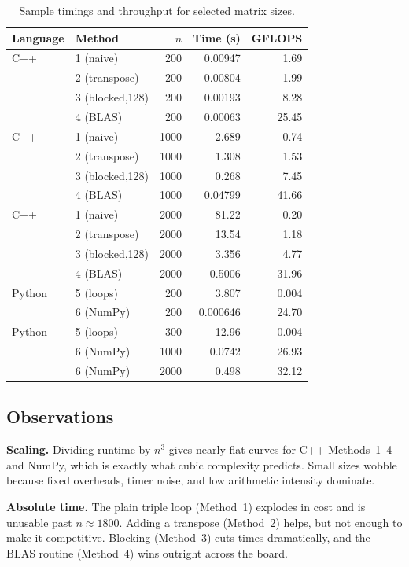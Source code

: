 \documentclass[11pt,a4paper]{article}
\begin{document}
	\begin{table}[H]
		\centering
		\caption{Sample timings and throughput for selected matrix sizes.}
		\begin{tabular}{llrrr}
			\toprule
			Language & Method & $n$ & Time (s) & GFLOPS \\
			\midrule
			C++ & 1 (naive)        & 200  & 0.00947  & 1.69 \\
			& 2 (transpose)    & 200  & 0.00804  & 1.99 \\
			& 3 (blocked,128)  & 200  & 0.00193  & 8.28 \\
			& 4 (BLAS)         & 200  & 0.00063  & 25.45 \\
			\midrule
			C++ & 1 (naive)        & 1000 & 2.689    & 0.74 \\
			& 2 (transpose)    & 1000 & 1.308    & 1.53 \\
			& 3 (blocked,128)  & 1000 & 0.268    & 7.45 \\
			& 4 (BLAS)         & 1000 & 0.04799  & 41.66 \\
			\midrule
			C++ & 1 (naive)        & 2000 & 81.22    & 0.20 \\
			& 2 (transpose)    & 2000 & 13.54    & 1.18 \\
			& 3 (blocked,128)  & 2000 & 3.356    & 4.77 \\
			& 4 (BLAS)         & 2000 & 0.5006   & 31.96 \\
			\midrule
			Python & 5 (loops)     & 200  & 3.807    & 0.004 \\
			& 6 (NumPy)     & 200  & 0.000646 & 24.70 \\
			Python & 5 (loops)     & 300  & 12.96    & 0.004 \\
			& 6 (NumPy)     & 1000 & 0.0742   & 26.93 \\
			& 6 (NumPy)     & 2000 & 0.498    & 32.12 \\
			\bottomrule
		\end{tabular}
		\label{tab:benchmarks}
	\end{table}
	
	
	\subsection{Observations}
	\textbf{Scaling.} Dividing runtime by $n^3$ gives nearly flat curves for C++ Methods~1--4 and NumPy, which is exactly what cubic complexity predicts. Small sizes wobble because fixed overheads, timer noise, and low arithmetic intensity dominate.  
	
	\textbf{Absolute time.} The plain triple loop (Method~1) explodes in cost and is unusable past $n \approx 1800$. Adding a transpose (Method~2) helps, but not enough to make it competitive. Blocking (Method~3) cuts times dramatically, and the BLAS routine (Method~4) wins outright across the board.  
	
\end{document}
